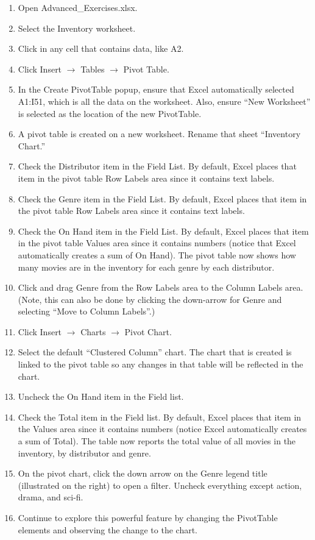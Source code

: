 \begin{enumerate}
	\item Open Advanced\_Exercises.xlsx.
	\item Select the Inventory worksheet. 
	\item Click in any cell that contains data, like A2.
	\item Click Insert $\rightarrow$ Tables $\rightarrow$ Pivot Table.
	\item In the Create PivotTable popup, ensure that Excel automatically selected A1:I51, which is all the data on the worksheet. Also, ensure “New Worksheet” is selected as the location of the new PivotTable.
	\item A pivot table is created on a new worksheet. Rename that sheet “Inventory Chart.”
	\item Check the Distributor item in the Field List. By default, Excel places that item in the pivot table Row Labels area since it contains text labels.
	\item Check the Genre item in the Field List. By default, Excel places that item in the pivot table Row Labels area since it contains text labels.
	\item Check the On Hand item in the Field List. By default, Excel places that item in the pivot table Values area since it contains numbers (notice that Excel automatically creates a sum of On Hand). The pivot table now shows how many movies are in the inventory for each genre by each distributor.
	\item Click and drag Genre from the Row Labels area to the Column Labels area. (Note, this can also be done by clicking the down-arrow for Genre and selecting “Move to Column Labels”.)
	\item Click Insert $\rightarrow$  Charts $\rightarrow$ Pivot Chart.
	\item Select the default “Clustered Column” chart. The chart that is created is linked to the pivot table so any changes in that table will be reflected in the chart.
	\item Uncheck the On Hand item in the Field list. 
	\item Check the Total item in the Field list. By default, Excel places that item in the Values area since it contains numbers (notice Excel automatically creates a sum of Total). The table now reports the total value of all movies in the inventory, by distributor and genre.
	\item On the pivot chart, click the down arrow on the Genre legend title (illustrated on the right) to open a filter. Uncheck everything except action, drama, and sci-fi.
	\item Continue to explore this powerful feature by changing the PivotTable elements and observing the change to the chart.
\end{enumerate}

